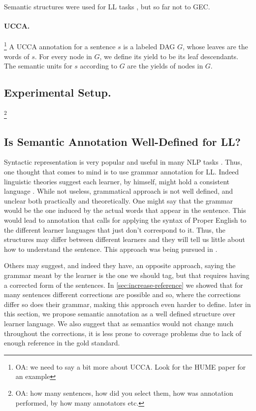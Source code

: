 \documentclass[english]{article}
\newcommand{\oa}[1]{\footnote{\color{red}OA: #1}}
\begin{document}
Semantic structures were used for LL tasks \cite{king2013shallow}, but so
far not to GEC.

\paragraph{UCCA.}\oa{we need to say a bit more about UCCA. Look for the HUME
  paper for an example}
A UCCA annotation for a sentence $s$ is a labeled DAG $G$, whose
leaves are the words of $s$. For every node in $G$,
we define its yield to be its leaf descendants. The
semantic units for $s$ according to $G$ are the yields
of nodes in $G$.


\subsection{Experimental Setup.}

\oa{how many sentences, how did you select them,
  how was annotation performed, by how many annotators etc.}


\subsection{Is Semantic Annotation Well-Defined for LL?}

Syntactic representation is very popular and useful in many NLP tasks 
\cite{mesfar2007named,ng2002improving,zollmann2006syntax}.
Thus, one thought that comes to mind is to use grammar annotation 
for LL. Indeed linguistic theories suggest each learner, by himself,
might hold a consistent 
language \cite{huebner1985system,tarone1983variability}.
While not useless, grammatical approach is not well
defined, and unclear both practically and theoretically. One might
say that the grammar would be the one induced by the actual words
that appear in the sentence. This would lead to annotation that calls
for applying the syntax of Proper English to the different learner
languages that just don't correspond to it. Thus, the structures may
differ between different learners and they will tell us little about
how to understand the sentence. This approach was being pursued in
\cite{berzak2016universal,ragheb2012defining}. 

Others may suggest, and indeed they have\cite{nagataphrase}, an opposite
approach, saying the grammar meant by the learner is the one we should
tag, but that requires having a corrected form of the sentences.
In \ref{sec:increase-reference} we showed that for many sentences different
corrections are possible and so, where the corrections differ so does their grammar,
making this approach even harder to define. later in this
section, we propose semantic annotation as a well defined structure over learner language. We also suggest that as semantics would not change much throughout the corrections, it is less prone to coverage problems due to lack of enough reference in the gold standard.
\end{document}

